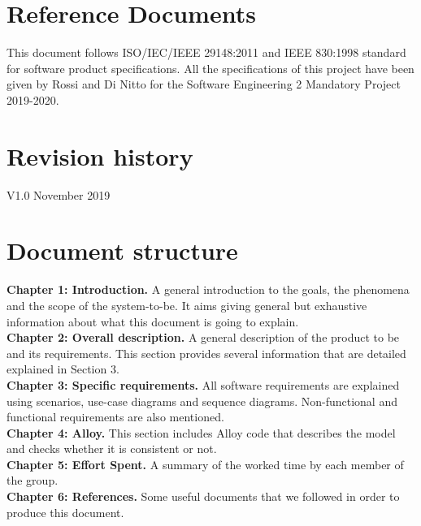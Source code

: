 \documentclass[../RASD.tex]{subfiles}
\begin{document}
    \section{Reference Documents}\label{sec:reference-documents}
    This document follows ISO/IEC/IEEE 29148:2011 and IEEE 830:1998 standard for software product specifications.
    All the specifications of this project have been given by Rossi and Di Nitto for the Software Engineering 2 Mandatory Project 2019-2020.

    \section{Revision history}\label{sec:revision-history}
    V1.0 November  2019

    \section{Document structure}\label{sec:document-structure}
    \textbf{Chapter 1: Introduction.} A general introduction to the goals, the phenomena and the scope of the system-to-be.
    It aims giving general but exhaustive information about what this document is going to explain.
    \\
    \textbf{Chapter 2: Overall description.} A general description of the product to be and its requirements.
    This section provides several information that are detailed explained in Section 3.
    \\
    \textbf{Chapter 3: Specific requirements.} All software requirements are explained using scenarios, use-case diagrams and sequence diagrams.
    Non-functional and functional requirements are also mentioned.
    \\
    \textbf{Chapter 4: Alloy.} This section includes Alloy code that describes the model and checks whether it is consistent or not.
    \\
    \textbf{Chapter 5: Effort Spent.} A summary of the worked time by each member of the group.
    \\
    \textbf{Chapter 6: References.} Some useful documents that we followed in order to produce this document.
\end{document}
